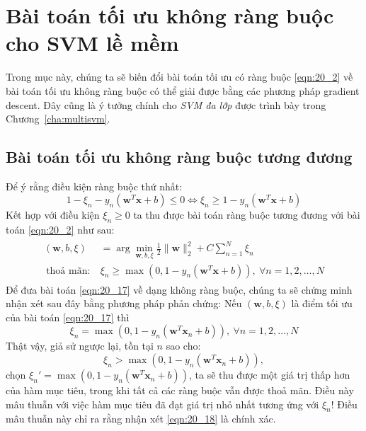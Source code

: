 \section{Bài toán tối ưu không ràng buộc cho SVM lề mềm }
Trong mục này, chúng ta sẽ biến đổi bài toán tối ưu có ràng buộc \eqref{eqn:20_2} về
 bài toán tối ưu không ràng buộc có thể giải được bằng các phương
pháp gradient descent. Đây cũng là ý tưởng chính cho \textit{SVM đa lớp} được trình
bày trong Chương~\ref{cha:multisvm}.
\newpage
\subsection{Bài toán tối ưu không ràng buộc tương đương}
Để ý rằng điều kiện ràng buộc thứ nhất: 
\begin{equation} 
1 - \xi_n -y_n(\mathbf{w}^T\mathbf{x} + b) \leq 0 \Leftrightarrow \xi_n \geq 1 - y_n(\mathbf{w}^T\mathbf{x} + b)
\end{equation} 
Kết hợp với điều kiện $\xi_n \geq 0$ ta thu được bài toán ràng buộc tương đương với bài toán \eqref{eqn:20_2} như sau: 
\begin{eqnarray} 
\label{eqn:20_17}
\begin{aligned}
    (\mathbf{w}, b, \xi) &= \arg \min_{\mathbf{w}, b, \xi} \frac{1}{2}{\|\mathbf{w}\|_2^2} + C \sum_{n=1}^N \xi_n  \\\ 
    \text{thoả mãn:}~ & \xi_n \geq \max(0, 1 - y_n(\mathbf{w}^T\mathbf{x} + b)), ~\forall n = 1, 2, \dots, N 
 \end{aligned} 
\end{eqnarray} 
Để đưa bài toán \eqref{eqn:20_17} về dạng không ràng buộc, chúng ta
sẽ chứng minh nhận xét sau đây bằng phương pháp phản chứng:
Nếu $(\mathbf{w}, b, \xi)$ là điểm tối ưu của bài toán \eqref{eqn:20_17} thì
\begin{equation} 
    \label{eqn:20_18}
    \xi_n = \max(0, 1 - y_n(\mathbf{w}^T\mathbf{x}_n + b)), ~\forall n = 1, 2, \dots, N
\end{equation}  
Thật vậy, giả sử ngược lại, tồn tại $n$ sao cho:
\begin{equation*} 
\xi_n > \max(0, 1 - y_n(\mathbf{w}^T\mathbf{x}_n + b)),
\end{equation*}  
chọn $\xi_n' = \max(0, 1 - y_n(\mathbf{w}^T\mathbf{x}_n + b))$, ta sẽ thu được
một giá trị thấp hơn của hàm mục tiêu, trong khi tất cả các ràng buộc vẫn được
thoả mãn. Điều này mâu thuẫn với việc hàm mục tiêu đã đạt giá trị nhỏ nhất tương ứng với $\xi_n$!
Điều mâu thuẫn này chỉ ra rằng nhận xét \eqref{eqn:20_18} là chính xác. 
 
